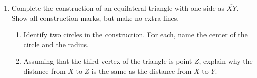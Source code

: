 \documentclass[12pt, twoside]{article}
\begin{document}
\begin{enumerate}
\newpage
  \item Complete the construction of an equilateral triangle with one side as $\overline{XY}$. Show all construction marks, but make no extra lines. \vspace{3cm}
    \begin{center}
    \end{center} \vspace{3cm}
    \begin{enumerate}
      \item Identify two circles in the construction. For each, name the center of the circle and the radius.  \vspace{3cm}
      \item Assuming that the third vertex of the triangle is point $Z$, explain why the distance from $X$ to $Z$ is the same as the distance from $X$ to $Y$.
    \end{enumerate}


\end{enumerate}
\end{document}

